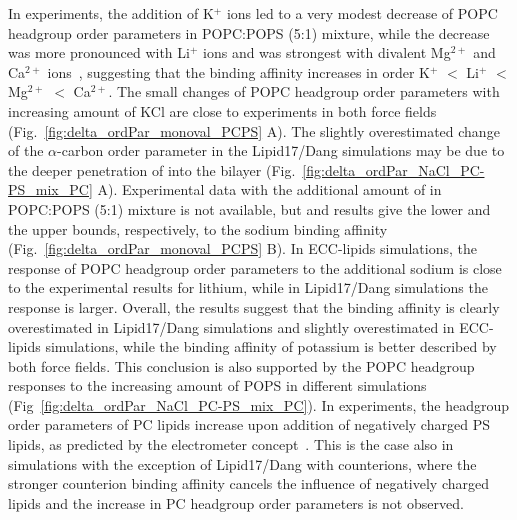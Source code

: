 \documentclass[journal=jctcce,manuscript=article]{achemso}
\begin{document}
In experiments, the addition of K$^+$ ions led to a very modest decrease of POPC headgroup order parameters in POPC:POPS (5:1) mixture,
while the decrease was more pronounced with Li$^+$ ions and was strongest with divalent Mg$^{2+}$ and Ca$^{2+}$ ions~\cite{roux90},
suggesting that the binding affinity increases in order K$^{+}$ $<$ Li$^{+}$  $<$ Mg$^{2+}$  $<$ Ca$^{2+}$.
The small changes of POPC headgroup order parameters with increasing amount of KCl are close to experiments
in both force fields (Fig.~\ref{fig:delta_ordPar_monoval_PCPS} A).
The slightly overestimated change of the $\alpha$-carbon
order parameter in the Lipid17/Dang simulations may be due to the
deeper penetration of  into the bilayer (Fig.~\ref{fig:delta_ordPar_NaCl_PC-PS_mix_PC} A).
Experimental data with the additional amount of  in POPC:POPS (5:1) mixture is not available,
but  and  results give the lower and the upper bounds, respectively, to the sodium binding
affinity (Fig.~\ref{fig:delta_ordPar_monoval_PCPS} B). In ECC-lipids simulations,
the response of POPC headgroup order parameters to the additional sodium is close to the
experimental results for lithium, while in Lipid17/Dang simulations the response is larger.
Overall, the results suggest that the  binding affinity is
clearly overestimated in Lipid17/Dang simulations and slightly overestimated in ECC-lipids simulations,
while the binding affinity of potassium is better described by both force fields.
This conclusion is also supported by the POPC headgroup responses to the
increasing amount of POPS in different simulations (Fig~\ref{fig:delta_ordPar_NaCl_PC-PS_mix_PC}).
In experiments, the headgroup order parameters of PC lipids increase upon addition of
negatively charged PS lipids, as predicted by the electrometer concept~\cite{seelig87,scherer87}.
This is the case also in simulations with the exception of
Lipid17/Dang with  counterions, where the stronger counterion binding affinity
cancels the influence of negatively charged lipids and the increase in PC headgroup
order parameters is not observed.
\end{document}
